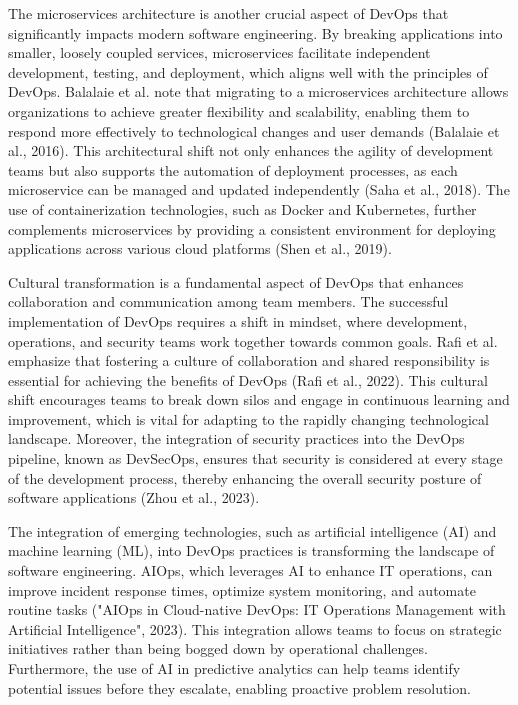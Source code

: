 The microservices architecture is another crucial aspect of DevOps that significantly impacts modern software engineering. By breaking applications into smaller, loosely coupled services, microservices facilitate independent development, testing, and deployment, which aligns well with the principles of DevOps. Balalaie et al. note that migrating to a microservices architecture allows organizations to achieve greater flexibility and scalability, enabling them to respond more effectively to technological changes and user demands (Balalaie et al., 2016). This architectural shift not only enhances the agility of development teams but also supports the automation of deployment processes, as each microservice can be managed and updated independently (Saha et al., 2018). The use of containerization technologies, such as Docker and Kubernetes, further complements microservices by providing a consistent environment for deploying applications across various cloud platforms (Shen et al., 2019).

Cultural transformation is a fundamental aspect of DevOps that enhances collaboration and communication among team members. The successful implementation of DevOps requires a shift in mindset, where development, operations, and security teams work together towards common goals. Rafi et al. emphasize that fostering a culture of collaboration and shared responsibility is essential for achieving the benefits of DevOps (Rafi et al., 2022). This cultural shift encourages teams to break down silos and engage in continuous learning and improvement, which is vital for adapting to the rapidly changing technological landscape. Moreover, the integration of security practices into the DevOps pipeline, known as DevSecOps, ensures that security is considered at every stage of the development process, thereby enhancing the overall security posture of software applications (Zhou et al., 2023).

The integration of emerging technologies, such as artificial intelligence (AI) and machine learning (ML), into DevOps practices is transforming the landscape of software engineering. AIOps, which leverages AI to enhance IT operations, can improve incident response times, optimize system monitoring, and automate routine tasks ("AIOps in Cloud-native DevOps: IT Operations Management with Artificial Intelligence", 2023). This integration allows teams to focus on strategic initiatives rather than being bogged down by operational challenges. Furthermore, the use of AI in predictive analytics can help teams identify potential issues before they escalate, enabling proactive problem resolution.

